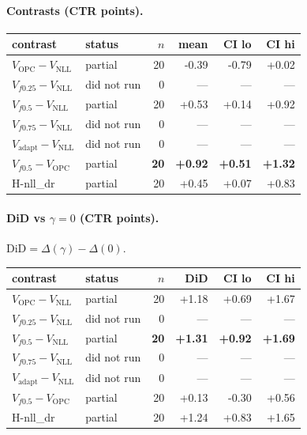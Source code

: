 \documentclass[10pt,a4paper]{article}
\begin{document}
\paragraph{Contrasts (CTR points).}
{\centering\small\begin{tabular}{llrrrr}
\toprule contrast & status & $n$ & mean & CI lo & CI hi \\
\midrule
$V_{\mathrm{OPC}}-V_{\mathrm{NLL}}$ & partial & 20 & -0.39 & -0.79 & +0.02 \\
$V_{f0.25}-V_{\mathrm{NLL}}$ & did not run & 0 & --- & --- & --- \\
$V_{f0.5}-V_{\mathrm{NLL}}$ & partial & 20 & +0.53 & +0.14 & +0.92 \\
$V_{f0.75}-V_{\mathrm{NLL}}$ & did not run & 0 & --- & --- & --- \\
$V_{\mathrm{adapt}}-V_{\mathrm{NLL}}$ & did not run & 0 & --- & --- & --- \\
\textbf{$V_{f0.5}-V_{\mathrm{OPC}}$} & partial & \textbf{20} & \textbf{+0.92} & \textbf{+0.51} & \textbf{+1.32} \\
H-nll\_dr & partial & 20 & +0.45 & +0.07 & +0.83 \\
\bottomrule\end{tabular}\par}
\paragraph{DiD vs $\gamma=0$ (CTR points).} $\mathrm{DiD}=\Delta(\gamma)-\Delta(0)$.
{\centering\small\begin{tabular}{llrrrr}
\toprule contrast & status & $n$ & DiD & CI lo & CI hi \\
\midrule
$V_{\mathrm{OPC}}-V_{\mathrm{NLL}}$ & partial & 20 & +1.18 & +0.69 & +1.67 \\
$V_{f0.25}-V_{\mathrm{NLL}}$ & did not run & 0 & --- & --- & --- \\
\textbf{$V_{f0.5}-V_{\mathrm{NLL}}$} & partial & \textbf{20} & \textbf{+1.31} & \textbf{+0.92} & \textbf{+1.69} \\
$V_{f0.75}-V_{\mathrm{NLL}}$ & did not run & 0 & --- & --- & --- \\
$V_{\mathrm{adapt}}-V_{\mathrm{NLL}}$ & did not run & 0 & --- & --- & --- \\
$V_{f0.5}-V_{\mathrm{OPC}}$ & partial & 20 & +0.13 & -0.30 & +0.56 \\
H-nll\_dr & partial & 20 & +1.24 & +0.83 & +1.65 \\
\bottomrule\end{tabular}\par}
\bigskip
\end{document}
